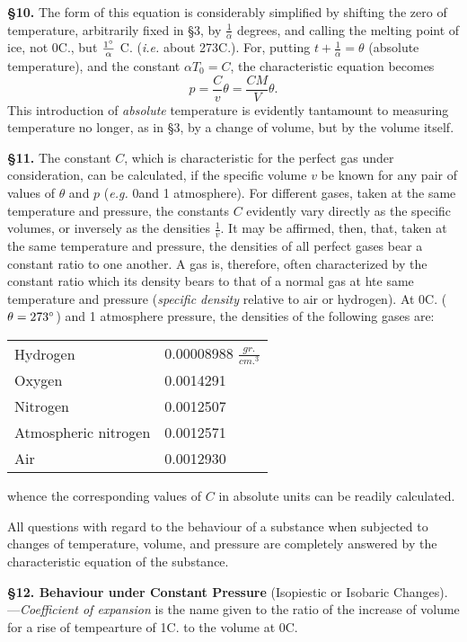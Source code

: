 \documentclass[oneside,12pt]{book}
\begin{document}
\setcounter{equation}{0}

\textbf{\S 10.} The form of this equation is considerably simplified by shifting the zero of temperature, arbitrarily fixed in \S 3, by $\frac{1}{\alpha}$ degrees, and calling the melting point of ice, not 0\textdegree C., but $\frac{1\degree}{\alpha}$ C. (\textit{i.e.} about 273\textdegree C.). For, putting $t+\frac{1}{\alpha}=\theta$ (absolute temperature), and the constant $\alpha T_0=C$, the characteristic equation becomes 
\begin{equation}
    p=\frac{C}{v}\theta=\frac{CM}{V}\theta.
    \label{eq10.5}
\end{equation}
This introduction of \textit{absolute} temperature is evidently tantamount to measuring temperature no longer, as in \S 3, by a change of volume, but by the volume itself. \par 

\textbf{\S 11.} The constant $C$, which is characteristic for the perfect gas under consideration, can be calculated, if the specific volume $v$ be known for any pair of values of $\theta$ and $p$ (\textit{e.g.} 0\degree and 1 atmosphere). For different gases, taken at the same temperature and pressure, the constants $C$ evidently vary directly as the specific volumes, or inversely as the densities $\frac{1}{v}$. It may be affirmed, then, that, taken at the same temperature and pressure, the densities of all perfect gases bear a constant ratio to one another. A gas is, therefore, often characterized by the constant ratio which its density bears to that of a normal gas at hte same temperature and pressure (\textit{specific density} relative to air or hydrogen). At 0\degree C. ($\theta=273\degree$) and 1 atmosphere pressure, the densities of the following gases are: 
\begin{center}
\begin{tabular}{ll}
    Hydrogen & 0.00008988 $\frac{gr.}{cm.^3}$ \\
    Oxygen & 0.0014291 \\
    Nitrogen & 0.0012507 \\
    Atmospheric nitrogen & 0.0012571 \\
    Air & 0.0012930
\end{tabular}
\end{center}
whence the corresponding values of $C$ in absolute units can be readily calculated. \par 

All questions with regard to the behaviour of a substance when subjected to changes of temperature, volume, and pressure are completely answered by the characteristic equation of the substance. \par 

\textbf{\S 12. Behaviour under Constant Pressure} (Isopiestic or Isobaric Changes).---\textit{Coefficient of expansion} is the name given to the ratio of the increase of volume for a rise of tempearture of 1\degree C. to the volume at 0\degree C.
\end{document}
